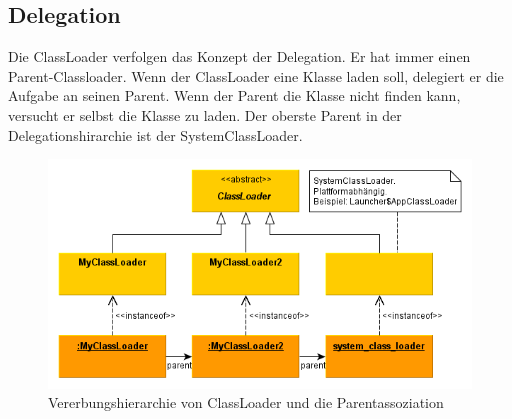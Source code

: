 \documentclass[a4paper,14pt]{scrreprt}
\begin{document}
\subsection{Delegation}
Die ClassLoader verfolgen das Konzept der Delegation. Er hat immer einen Parent-Classloader. Wenn der ClassLoader eine Klasse laden soll, delegiert er die Aufgabe an seinen Parent. Wenn der Parent die Klasse nicht finden kann, versucht er selbst die Klasse zu laden. Der oberste Parent in der Delegationshirarchie ist der SystemClassLoader.
\begin{figure}[h!]
\centering
\includegraphics[width=0.8\linewidth]{./classloader-hierarchie}
\caption[Vererbungshierarchie von ClassLoader und die Parentassoziation]{Vererbungshierarchie von ClassLoader und die Parentassoziation}
\label{fig:classloader-hierarchie}
\end{figure}
\newpage
\end{document}
